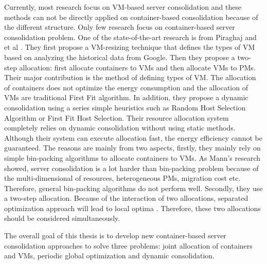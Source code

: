 Currently, most research focus on VM-based server consolidation and these methods can not be directly applied on container-based consolidation because of the different structure. Only few research focus on container-based server consolidation problem. One of the state-of-the-art research is from Piraghaj and et al \cite{Piraghaj:2015uf}. They first propose a VM-resizing technique that defines the types of VM based on analyzing the historical data from Google. Then they propose a two-step allocation: first allocate containers to VMs and then allocate VMs to PMs. Their major contribution is the method of defining types of VM. The allocation of containers does not optimize the energy consumption and the allocation of VMs are traditional First Fit algorithm. In addition, they propose a dynamic consolidation \cite{Piraghaj:2016bw} using a series simple heuristics such as Random Host Selection Algorithm or First Fit Host Selection. 
Their resource allocation system completely relies on dynamic consolidation without using static methods. Although their system can execute allocation fast, the energy efficiency cannot be guaranteed.
The reasons are mainly from two aspects, firstly, they mainly rely on simple bin-packing algorithms to allocate containers to VMs. As Mann's research \cite{Mann:2015ua} showed, server consolidation is a lot harder than bin-packing problem because of the multi-dimensional of resources, heterogeneous PMs, migration cost etc. Therefore, general bin-packing algorithms do not perform well. Secondly, they use a two-step allocation. Because of the interaction of two allocations, separated optimization approach will lead to local optima \cite{Mann:2016hx}. Therefore, these two allocations should be considered simultaneously.

The overall goal of this thesis is to develop new container-based server consolidation approaches to solve three problems: joint allocation of containers  and VMs, periodic global optimization and dynamic consolidation. 
